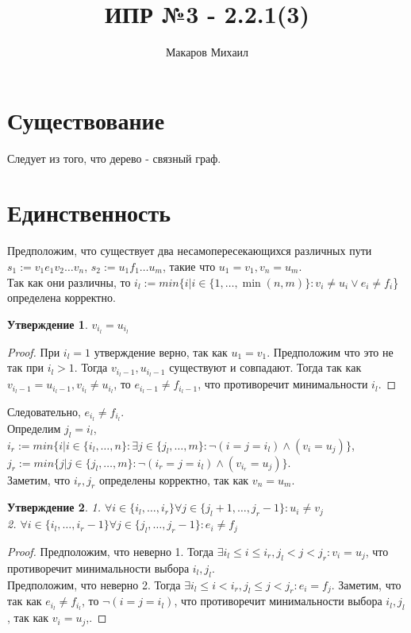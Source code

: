 \documentclass{article}
\title{ИПР №3 - 2.2.1(3)}
\author{Макаров Михаил}
\date{}
\newcommand{\range}[2]{
    \{#1, \ldots, #2 \}
}
\newtheorem{prop}{Утверждение}
\begin{document}
	\maketitle
	\section{Существование}
	Следует из того, что дерево - связный граф.
	\section{Единственность}
	Предположим, что существует два несамопересекающихся различных пути $s_1 := v_1e_1v_2\ldots v_n$,
	$s_2 := u_1f_1\ldots u_m$, такие что $u_1 = v_1, v_n = u_m$.\\
	Так как они различны, то
	$i_l := min\{i| i \in \range{1}{\min(n, m)}: v_i \neq u_i \lor e_i \neq f_i$\} определена корректно.\\
    \begin{prop} 
        $v_{i_l} = u_{i_l}$
    \end{prop}
    \begin{proof}
        При $i_l = 1$ утверждение верно, так как $u_1 = v_1$.
        Предположим что это не так при $i_l > 1$. Тогда $v_{i_l - 1}, u_{i_l - 1}$ существуют 
        и совпадают. Тогда так как 
        $v_{i_l - 1} = u_{i_l - 1}, v_{i_l} \neq u_{i_l}$, то $e_{i_l - 1} \neq f_{i_l - 1}$, что противоречит
        минимальности $i_l$.
    \end{proof}
    Следовательно, $e_{i_l} \neq f_{i_l}$.\\
    Определим $j_l = i_l$,\\
    $i_r := min\{i| i \in \range{i_l}{n}: \exists j \in \range{j_l}{m}: \neg(i = j = i_l) \land (v_i = u_j) \}$,\\
    $j_r := min\{j| j \in \range{j_l}{m}: \neg(i_r = j = i_l) \land (v_{i_r} = u_j) \}$.\\
    Заметим, что $i_r, j_r$ определены корректно, так как $v_n = u_m$.\\
    \begin{prop}
        1. $\forall i \in \range{i_l}{i_r} \forall j \in \range{j_l + 1}{j_r - 1}: u_{i} \neq v_{j}$\\
        2. $\forall i \in \range{i_l}{i_r - 1} \forall j \in \range{j_l}{j_r - 1}: e_{i} \neq f_{j}$
    \end{prop}
    \begin{proof}
        Предположим, что неверно 1. Тогда $\exists i_l \leq i \leq i_r, j_l < j < j_r: v_{i} = u_{j}$, что    
        противоречит минимальности выбора $i_l, j_l$.\\
        Предположим, что неверно 2. Тогда $\exists i_l \leq i < i_r, j_l \leq j < j_r: e_{i} = f_{j}$. Заметим, что
        так как $e_{i_l} \neq f_{i_l}$, то $\neg(i = j = i_l)$, что противоречит
        минимальности выбора $i_l, j_l$, так как $v_i = u_j$,.        
    \end{proof}
\end{document}
